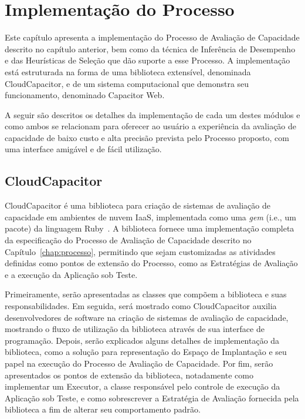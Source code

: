 \chapter{Implementação do Processo}
\label{chap:capacitor}
Este capítulo apresenta a implementação do
Processo de Avaliação de Capacidade descrito no capítulo anterior, bem como da técnica de
Inferência de Desempenho e das Heurísticas de Seleção que dão suporte a esse
Processo. A implementação está estruturada na forma de uma biblioteca
extensível, denominada CloudCapacitor, e de um sistema computacional que demonstra seu funcionamento, denominado Capacitor Web. 


A seguir são descritos os detalhes da implementação de cada um destes módulos e
como ambos se relacionam para oferecer ao usuário a experiência da avaliação de capacidade
de baixo custo e alta precisão prevista pelo Processo proposto, com uma interface
amigável e de fácil utilização.

\section{CloudCapacitor}
CloudCapacitor é uma biblioteca para criação de sistemas de avaliação de 
capacidade em ambientes de nuvem IaaS, implementada como uma \emph{gem}
(i.e., um pacote) da linguagem Ruby~\cite{ruby}. A biblioteca fornece uma implementação
completa da especificação do Processo de Avaliação de Capacidade descrito no 
Capítulo~\ref{chap:processo}, permitindo que sejam customizadas as atividades 
definidas como pontos de extensão do Processo, como as Estratégias de Avaliação
e a execução da Aplicação sob Teste.

Primeiramente, serão apresentadas as classes que compõem a biblioteca
e suas responsabilidades. Em seguida, será mostrado como CloudCapacitor auxilia 
desenvolvedores de software na criação de sistemas de avaliação de capacidade,
mostrando o fluxo de utilização da biblioteca através de sua interface de programação.
Depois, serão explicados alguns detalhes de implementação da biblioteca, como 
a solução para representação do Espaço de Implantação e seu papel na execução do
Processo de Avaliação de Capacidade. Por fim, serão apresentados os pontos de extensão
da biblioteca, notadamente como implementar um Executor, a classe responsável pelo
controle de execução da Aplicação sob Teste, e como sobrescrever a Estratégia de
Avaliação fornecida pela biblioteca a fim de alterar seu comportamento padrão.

